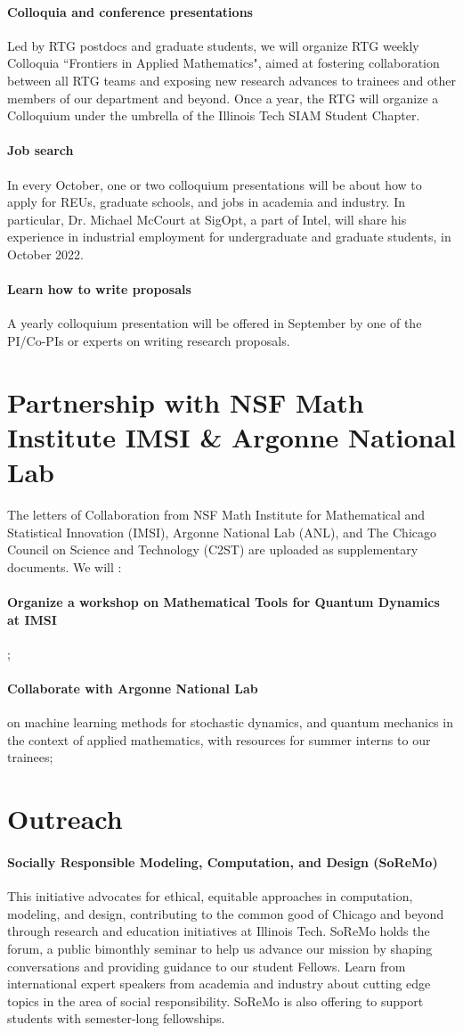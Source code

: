 \documentclass[11pt]{NSFamsart}
\newcommand{\bfparagraph}[1]{\paragraph{\textbf{\textup{#1}}}}
\begin{document}
\bfparagraph{Colloquia and conference presentations}
Led by RTG postdocs and graduate students, we will organize RTG  weekly   Colloquia ``Frontiers in Applied Mathematics",  aimed at fostering collaboration between all RTG teams and exposing new research advances to trainees and other members of our department and beyond.   
Once a year, the RTG  will organize a Colloquium  under the umbrella of the Illinois Tech SIAM Student Chapter.  

 

\bfparagraph{Job search}
In every October, one or two colloquium presentations will be about how to apply for REUs, graduate schools, and   jobs   in academia and industry. 
In particular, Dr. Michael McCourt at SigOpt, a part of Intel, will share  his experience in industrial employment for undergraduate and graduate students, in October 2022. 

\bfparagraph{Learn how to write proposals}
A yearly colloquium presentation  will be offered in September by one of the PI/Co-PIs or experts on   writing research proposals. 


\section{Partnership with NSF Math Institute IMSI \& Argonne National Lab}

The letters of Collaboration from NSF Math Institute for Mathematical and Statistical Innovation (IMSI), Argonne National Lab (ANL), and 
The Chicago Council on Science and Technology (C2ST) are uploaded as supplementary documents.  We will :\\
\bfparagraph{Organize a workshop on Mathematical Tools for Quantum Dynamics   at IMSI};   
\bfparagraph{Collaborate with Argonne National Lab} on machine learning methods for stochastic dynamics, and quantum mechanics in the context of applied mathematics, with resources for summer interns to our trainees;  
 




\section{Outreach}

\bfparagraph{Socially Responsible Modeling, Computation, and Design
(SoReMo)}
This initiative advocates for ethical, equitable approaches in computation,
modeling, and design, contributing to the common good of Chicago and
beyond through research and education initiatives at Illinois Tech.
SoReMo holds the forum,  a public bimonthly seminar to help us advance
our mission by shaping conversations and providing guidance to our
student Fellows. Learn from international expert speakers from academia
and industry about cutting edge topics in the area of social responsibility.
SoReMo is also offering to support students with semester-long fellowships.   
\end{document}
